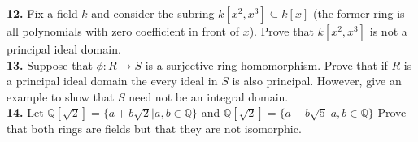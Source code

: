 \documentclass[oneside,10pt]{amsart}
\begin{document}
{\bf 12.}  Fix a field $k$ and consider the subring $k[x^2, x^3] \subseteq k[x]$ (the former ring is all polynomials with zero coefficient in front of $x$).  Prove that $k[x^2, x^3]$ is not a principal ideal domain.\\
{\bf 13.}  Suppose that $\phi : R \to S$ is a surjective ring homomorphism.  Prove that if $R$ is a principal ideal domain the every ideal in $S$ is also principal.  However, give an example to show that $S$ need not be an integral domain. \\
{\bf 14.}   Let $\mathbb{Q}[\sqrt{2}] = \{a + b\sqrt{2} | a, b \in \mathbb{Q} \}$ and $\mathbb{Q}[\sqrt{2}] = \{a + b\sqrt{5} | a, b \in \mathbb{Q} \}$  Prove that both rings are fields but that they are not isomorphic.  
\end{document}
